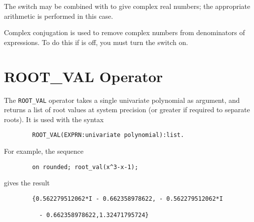 The switch  may be combined with  to give complex
real numbers; the appropriate arithmetic is performed in this case.

\hypertarget{switch:RATIONALIZE}{}
Complex conjugation is used to remove complex numbers from denominators of
expressions.  To do this if  is off, you must turn the switch
 on.

\section{ROOT\_VAL Operator}
\hypertarget{operator:ROOT_VAL}{}

The \texttt{ROOT\_VAL}  operator takes a single univariate polynomial as
argument, and returns a list of root values at system precision (or
greater if required to separate roots).  It is used with the syntax
\begin{verbatim}
        ROOT_VAL(EXPRN:univariate polynomial):list.
\end{verbatim}
For example, the sequence
\begin{verbatim}
        on rounded; root_val(x^3-x-1);
\end{verbatim}
gives the result
\begin{verbatim}
        {0.562279512062*I - 0.662358978622, - 0.562279512062*I

          - 0.662358978622,1.32471795724}
\end{verbatim}

